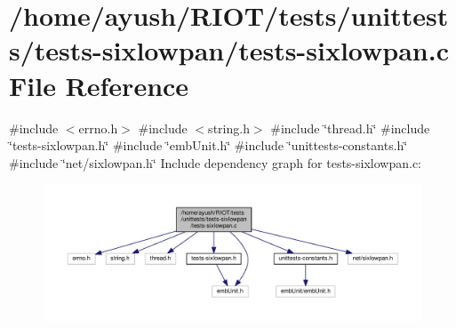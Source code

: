 \hypertarget{tests-sixlowpan_8c}{}\section{/home/ayush/\+R\+I\+O\+T/tests/unittests/tests-\/sixlowpan/tests-\/sixlowpan.c File Reference}
\label{tests-sixlowpan_8c}
{\ttfamily \#include $<$errno.\+h$>$}\newline
{\ttfamily \#include $<$string.\+h$>$}\newline
{\ttfamily \#include \char`\"{}thread.\+h\char`\"{}}\newline
{\ttfamily \#include \char`\"{}tests-\/sixlowpan.\+h\char`\"{}}\newline
{\ttfamily \#include \char`\"{}emb\+Unit.\+h\char`\"{}}\newline
{\ttfamily \#include \char`\"{}unittests-\/constants.\+h\char`\"{}}\newline
{\ttfamily \#include \char`\"{}net/sixlowpan.\+h\char`\"{}}\newline
Include dependency graph for tests-\/sixlowpan.c\+:
\nopagebreak
\begin{figure}[H]
\begin{center}
\leavevmode
\includegraphics[width=350pt]{tests-sixlowpan_8c__incl}
\end{center}
\end{figure}
